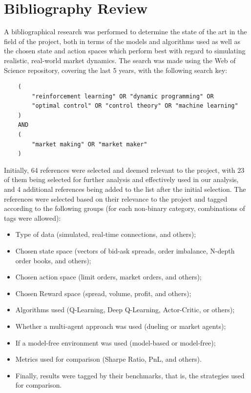 \section{Bibliography Review}
\label{sec:bibliography-review}

A bibliographical research was performed to determine the state of the art in the field of the project,
both in terms of the models and algorithms used as well as the chosen state and action spaces which perform best
with regard to simulating realistic, real-world market dynamics.
The search was made using the Web of Science repository, covering the last 5 years, with the following search key:

\begin{verbatim}
    (
        "reinforcement learning" OR "dynamic programming" OR
        "optimal control" OR "control theory" OR "machine learning"
    )
    AND
    (
        "market making" OR "market maker"
    )
\end{verbatim}

Initially, 64 references were selected and deemed relevant to the project, with 23 of them being selected for further analysis and effectively used in our analysis,
and 4 additional references being added to the list after the initial selection.
The references were selected based on their relevance to the project and tagged according to the following groups
(for each non-binary category, combinations of tags were allowed):

\begin{itemize}
    \item Type of data (simulated, real-time connections, and others);
    \item Chosen state space (vectors of bid-ask spreads, order imbalance, N-depth order books, and others);
    \item Chosen action space (limit orders, market orders, and others);
    \item Chosen Reward space (spread, volume, profit, and others);
    \item Algorithms used (Q-Learning, Deep Q-Learning, Actor-Critic, or others);
    \item Whether a multi-agent approach was used (dueling or market agents);
    \item If a model-free environment was used (model-based or model-free);
    \item Metrics used for comparison (Sharpe Ratio, PnL, and others).
    \item Finally, results were tagged by their benchmarks, that is, the strategies used for comparison.
\end{itemize}

